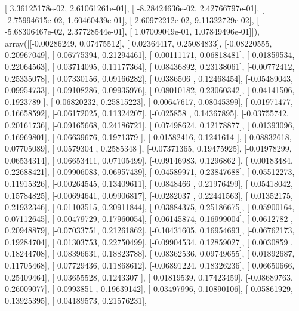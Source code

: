 \documentclass{article}
\begin{document}
       [  3.36125178e-02,   2.61061261e-01],
       [ -8.28424636e-02,   2.42766797e-01],
       [ -2.75994615e-02,   1.60460439e-01],
       [  2.60972212e-02,   9.11322729e-02],
       [ -5.68306467e-02,   2.37728544e-01],
       [  1.07009049e-01,   1.07849496e-01]]), array([[-0.00286249,  0.07475512],
       [ 0.02364417,  0.25084833],
       [-0.08220555,  0.20967049],
       [-0.06775394,  0.21294461],
       [ 0.00111171,  0.06818481],
       [-0.01859534,  0.22064563],
       [ 0.03714095,  0.11177364],
       [ 0.08436892,  0.23138061],
       [-0.00772412,  0.25335078],
       [ 0.07330156,  0.09166282],
       [ 0.0386506 ,  0.12468454],
       [-0.05489043,  0.09954733],
       [ 0.09108286,  0.09935976],
       [-0.08010182,  0.23060342],
       [-0.04141506,  0.1923789 ],
       [-0.06820232,  0.25815223],
       [-0.00647617,  0.08045399],
       [-0.01971477,  0.16658592],
       [-0.06172025,  0.11324207],
       [-0.025858  ,  0.14367895],
       [-0.03755742,  0.20161736],
       [-0.09165668,  0.24186721],
       [ 0.07498624,  0.12178877],
       [ 0.01393096,  0.16969801],
       [ 0.06639676,  0.1971379 ],
       [ 0.01582416,  0.1241614 ],
       [-0.08832618,  0.07705089],
       [ 0.0579304 ,  0.2585348 ],
       [-0.07371365,  0.19475925],
       [-0.01978299,  0.06534314],
       [ 0.06653411,  0.07105499],
       [-0.09146983,  0.1296862 ],
       [ 0.00183484,  0.22688421],
       [-0.09906083,  0.06957439],
       [-0.04589971,  0.23847688],
       [-0.05512273,  0.11915326],
       [-0.00264545,  0.13409611],
       [ 0.0848466 ,  0.21976499],
       [ 0.05418042,  0.15784825],
       [-0.00694641,  0.09906817],
       [-0.0282037 ,  0.22441563],
       [ 0.01352175,  0.21932346],
       [ 0.01103515,  0.20911844],
       [-0.03884375,  0.25186675],
       [-0.05900164,  0.07112645],
       [-0.00479729,  0.17960054],
       [ 0.06145874,  0.16999004],
       [ 0.0612782 ,  0.20948879],
       [-0.07033751,  0.21261862],
       [-0.10431605,  0.16954693],
       [-0.06762173,  0.19284704],
       [ 0.01303753,  0.22750499],
       [-0.09904534,  0.12859027],
       [ 0.0030859 ,  0.18244708],
       [ 0.08396631,  0.18823788],
       [ 0.08362536,  0.09749655],
       [ 0.01892687,  0.11705468],
       [ 0.07729436,  0.11868612],
       [-0.06891224,  0.18326236],
       [ 0.06650666,  0.25409464],
       [ 0.03655528,  0.1243307 ],
       [ 0.01819539,  0.17423459],
       [-0.08689763,  0.26009077],
       [ 0.0993851 ,  0.19639142],
       [-0.03497996,  0.10890106],
       [ 0.05861929,  0.13925395],
       [ 0.04189573,  0.21576231],
\end{document}
